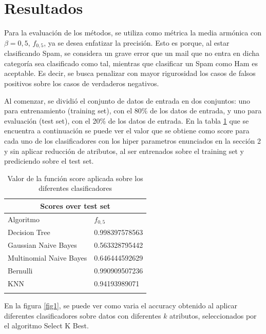 \documentclass[hidelinks,a4paper,11pt, nofootinbib]{article}
\begin{document}
\section{Resultados}

Para la evaluación de los métodos, se utiliza como métrica la media armónica con $\beta = 0,5$, $f_{0,5}$, ya se desea enfatizar la precisión. Esto es porque, al estar clasificando Spam, se considera un grave error que un mail que no entra en dicha categoría sea clasificado como tal, mientras que clasificar un Spam como Ham es aceptable. Es decir, se busca penalizar con mayor rigurosidad los casos de falsos positivos sobre los casos de verdaderos negativos.

Al comenzar, se dividió el conjunto de datos de entrada en dos conjuntos: uno para entrenamiento (training set), con el 80\% de los datos de entrada, y uno para evaluación (test set), con el 20\% de los datos de entrada. En la tabla \ref{tab1} que se encuentra a continuación se puede ver el valor que se obtiene como score para cada uno de los clasificadores con los hiper parametros enunciados en la sección 2 y sin aplicar reducción de atributos, al ser entrenados sobre el training set y prediciendo sobre el test set.

\begin{table}[ht!]
\centering
    \begin{tabular}{| l | l|}
        \hline
        \multicolumn{2}{|c|}{Scores over test set} \\
        \hline
        Algoritmo & $f_{0,5}$ \\
        \hline
        Decision Tree & 0.998397578563 \\
        Gaussian Naive Bayes & 0.563328795442 \\
        Multinomial Naive Bayes & 0.646444592629 \\
        Bernulli  & 0.990909507236 \\
        KNN & 0.94193989071 \\
        \color{red}{Random Forest} & \color{red}{0.999622322936} \\
        \hline
    \end{tabular}
    \caption{Valor de la función score aplicada sobre los diferentes clasificadores}
    \label{tab1}
\end{table}

\newpage

En la figura \ref{fig1}, se puede ver como varia el accuracy obtenido al aplicar diferentes clasificadores sobre datos con diferentes $k$ atributos, seleccionados por el algoritmo Select K Best.
\end{document}
